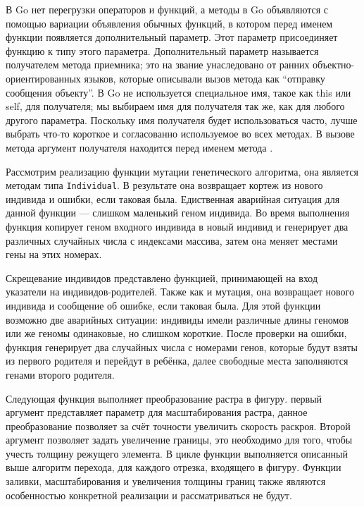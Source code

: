 \documentclass[14pt]{extarticle}
\begin{document}
	В Go нет перегрузки операторов и функций, а методы в Go объявляются с помощью вариации объявления обычных функций, в кото­ром перед именем функции появляется дополнительный параметр. Этот параметр присоединяет функцию к типу этого параметра. Дополнительный параметр называется получателем метода приемника; это на­	звание унаследовано от ранних объектно-ориентированных языков, которые описы­вали вызов метода как “отправку сообщения объекту”. В Go не используется специальное имя, такое как this или self, для получателя; мы выбираем имя для получателя так же, как для любого другого параметра. Поскольку имя получателя будет использоваться часто, лучше выбрать что-то короткое и согласованно используемое во всех методах. В вызове метода аргумент получателя находится перед именем метода \cite{Golang}.

	
	Рассмотрим реализацию функции мутации генетического алгоритма, она является методам типа \lstinline|Individual|. В результате она возвращает кортеж из нового индивида и ошибки, если таковая была. Едиственная аварийная ситуация для данной функции --- слишком маленький геном индивида. Во время выполнения функция копирует геном входного индивида в новый индивид и генерирует два различных случайных числа с индексами массива, затем она меняет местами гены на этих номерах.
	
	
	Скрещевание индивидов представлено функцией, принимающей на вход указатели на индивидов-родителей. Также как и мутация, она возвращает нового индивида и сообщение об ошибке, если таковая была. Для этой функции возможно две аварийных ситуации: индивиды имели различные длины геномов или же геномы одинаковые, но слишком короткие. После проверки на ошибки, функция генерирует два случайных числа с номерами генов, которые будут взяты из первого родителя и перейдут в ребёнка, далее свободные места заполняются генами второго родителя.
	
	
	Следующая функция выполняет преобразование растра в фигуру. первый аргумент представляет параметр для масштабирования растра, данное преобразование позволяет за счёт точности увеличить скорость раскроя. Второй аргумент позволяет задать увеличение границы, это необходимо для того, чтобы учесть толщину режущего элемента. В цикле функции выполняется описанный выше алгоритм перехода, для каждого отрезка, входящего в фигуру. Функции заливки, масштабирования и увеличения толщины границ также являются особенностью конкретной реализации и рассматриваться не будут.
	
	
\end{document}
